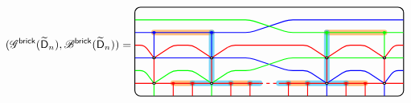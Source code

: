 \begin{align*}
(\ngraph^{\mathsf{brick}}(\exdynD_n),\nbasis^{\mathsf{brick}}(\exdynD_n))=
\begin{tikzpicture}[baseline=10ex, xscale=0.6, yscale=0.4]
\draw[rounded corners=5, thick] (0, 0) rectangle (14, 7);
\clip[rounded corners=5] (0, 0) rectangle (14, 7);
\draw[color=cyclecolor1, line cap=round, line width=5, opacity=0.5]
(1,5)--(4,5) (10,5)--(13,5) (2,1)--(3,1) (5,1)--(6,1) (8,1)--(9,1) (11,1)--(12,1);
\draw[color=cyan, line cap=round, line width=5, opacity=0.5]
(3,1)--(5,1) (4,1)--(4,5) (9,1)--(11,1) (10,1)--(10,5) (6,1)--(6.5,1) (7.5,1)--(8,1);
\draw[blue,thick,rounded corners]
(0,3)--(6,3)--(8,2)--(9,2)--(10,1) (10,1)--(11,2)--(12,2)--(13,1) (13,1)--(13.5,2)--(14,2)
(0,5)--(6,5)--(8,6)--(14,6)
(1,3)--(1,5) (4,3)--(4,5) (10,0)--(10,1) (13,0)--(13,1);
\draw[red,thick,rounded corners] (0,1)--(6.5,1) (7.5,1)--(14,1)
(0,4)--(0.5,4)--(1,3) (1,3)--(2,4)--(3,4)--(4,3) (4,3)--(5,4)--(9,4)--(10,3) (10,3)--(11,4)--(12,4)--(13,3) (13,3)--(13.5,4)--(14,4)
(2,0)--(2,1) (3,0)--(3,1) (5,0)--(5,1) (6,0)--(6,1) (8,0)--(8,1) (9,0)--(9,1) (11,0)--(11,1) (12,0)--(12,1)
(1,1)--(1,3) (4,1)--(4,3) (10,1)--(10,3) (13,1)--(13,3);
\draw[red,thick, dashed] (6.5,1)--(7.5,1);
\draw[green,thick,rounded corners]
(0,2)--(0.5,2)--(1,1) (1,1)--(2,2)--(3,2)--(4,1) (4,1)--(5,2)--(6,2)--(8,3)--(14,3)
(0,6)--(6,6)--(8,5)--(14,5)
(1,0)--(1,1) (4,0)--(4,1) (10,3)--(10,5) (13,3)--(13,5);
\draw[fill, blue, thick]
(1,5) circle (2pt) (4,5) circle (2pt);
\draw[fill, red, thick]
(2,1) circle (2pt) (3,1) circle (2pt) (5,1) circle (2pt) (6,1) circle (2pt) (8,1) circle (2pt) (9,1) circle (2pt)
(11,1) circle (2pt) (12,1) circle (2pt);
\draw[fill, green, thick]
(10,5) circle (2pt) (13,5) circle (2pt);
\draw[fill=white, thick]
(1,1) circle (2pt) (4,1) circle (2pt) (10,1) circle (2pt) (13,1) circle (2pt) (1,3) circle (2pt) (4,3) circle (2pt) (10,3) circle (2pt) (13,3) circle (2pt);
\end{tikzpicture}
\end{align*}

